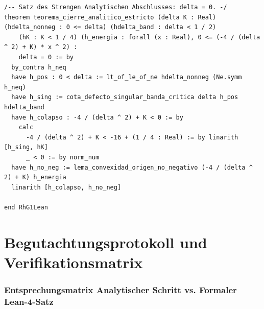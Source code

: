 \documentclass[11pt,a4paper]{article}
\theoremstyle{definition}
\theoremstyle{remark}
\begin{document}
\begin{lstlisting}[language=Lean4]
/-- Satz des Strengen Analytischen Abschlusses: delta = 0. -/
theorem teorema_cierre_analitico_estricto (delta K : Real) (hdelta_nonneg : 0 <= delta) (hdelta_band : delta < 1 / 2)
    (hK : K < 1 / 4) (h_energia : forall (x : Real), 0 <= (-4 / (delta ^ 2) + K) * x ^ 2) :
    delta = 0 := by
  by_contra h_neq
  have h_pos : 0 < delta := lt_of_le_of_ne hdelta_nonneg (Ne.symm h_neq)
  have h_sing := cota_defecto_singular_banda_critica delta h_pos hdelta_band
  have h_colapso : -4 / (delta ^ 2) + K < 0 := by
    calc
      -4 / (delta ^ 2) + K < -16 + (1 / 4 : Real) := by linarith [h_sing, hK]
      _ < 0 := by norm_num
  have h_no_neg := lema_convexidad_origen_no_negativo (-4 / (delta ^ 2) + K) h_energia
  linarith [h_colapso, h_no_neg]

end RhG1Lean
\end{lstlisting}

\newpage

\part{Begutachtungsprotokoll und Verifikationsmatrix}

\section{Entsprechungsmatrix Analytischer Schritt vs. Formaler Lean-4-Satz}
\end{document}
